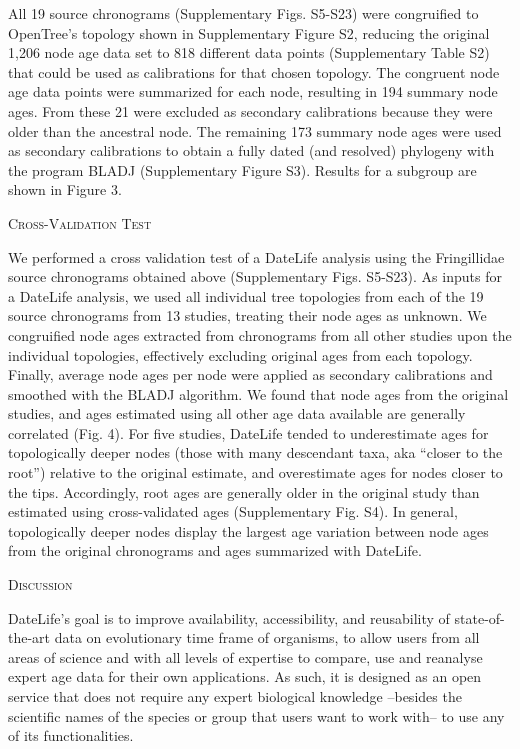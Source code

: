 \documentclass[english,man]{apa6}
\begin{document}
All 19 source chronograms (Supplementary Figs. S5-S23) were congruified to OpenTree's topology shown in Supplementary Figure S2, reducing the original 1,206 node age data set to 818 different data points (Supplementary Table S2) that could be used as calibrations for that chosen topology. The congruent node age data points were summarized for each node, resulting in 194 summary node ages. From these 21 were excluded as secondary calibrations because they were older than the ancestral node. The remaining 173 summary node ages were used as secondary calibrations to obtain a fully dated (and resolved) phylogeny with the program BLADJ (Supplementary Figure S3). Results for a subgroup are shown in Figure 3.

\begin{center}
\textsc{Cross-Validation Test}
\end{center}

We performed a cross validation test of a DateLife analysis using the Fringillidae source chronograms obtained above (Supplementary Figs. S5-S23).
As inputs for a DateLife analysis, we used all individual tree topologies from each of the 19 source chronograms from 13 studies, treating their node ages as unknown.
We congruified node ages extracted from chronograms from all other studies upon the individual topologies, effectively excluding original ages from each topology. Finally, average node ages per node were applied as secondary calibrations and smoothed with the BLADJ algorithm.
We found that node ages from the original studies, and ages estimated using all other age data available are generally correlated (Fig. 4).
For five studies, DateLife tended to underestimate ages for topologically deeper nodes (those with many descendant taxa, aka \enquote{closer to the root}) relative to the original estimate, and overestimate ages for nodes closer to the tips. Accordingly, root ages are generally older in the original study than estimated using cross-validated ages (Supplementary Fig. S4).
In general, topologically deeper nodes display the largest age variation between node ages from the original chronograms and ages summarized with DateLife.

\begin{center}
\textsc{Discussion}
\end{center}

DateLife's goal is to improve availability, accessibility, and reusability of state-of-the-art data on evolutionary time frame of organisms, to allow users from all areas of science and with all levels of expertise to compare, use and reanalyse expert age data for their own applications. As such, it is designed as an open service that does not require any expert biological knowledge --besides the scientific names of the species or group that users want to work with-- to use any of its functionalities.
\end{document}
